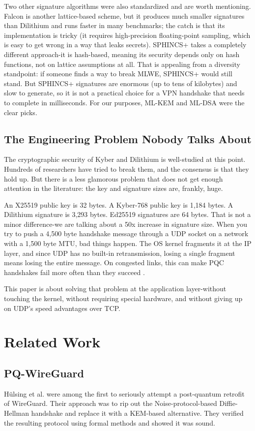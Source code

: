 \documentclass[10pt, conference, letterpaper]{IEEEtran}
\begin{document}
Two other signature algorithms were also standardized and are worth mentioning. Falcon is another lattice-based scheme, but it produces much smaller signatures than Dilithium and runs faster in many benchmarks; the catch is that its implementation is tricky (it requires high-precision floating-point sampling, which is easy to get wrong in a way that leaks secrets). SPHINCS+ takes a completely different approach-it is hash-based, meaning its security depends only on hash functions, not on lattice assumptions at all. That is appealing from a diversity standpoint: if someone finds a way to break MLWE, SPHINCS+ would still stand. But SPHINCS+ signatures are enormous (up to tens of kilobytes) and slow to generate, so it is not a practical choice for a VPN handshake that needs to complete in milliseconds. For our purposes, ML-KEM and ML-DSA were the clear picks.

\subsection{The Engineering Problem Nobody Talks About}
The cryptographic security of Kyber and Dilithium is well-studied at this point. Hundreds of researchers have tried to break them, and the consensus is that they hold up. But there is a less glamorous problem that does not get enough attention in the literature: the key and signature sizes are, frankly, huge.

An X25519 public key is 32 bytes. A Kyber-768 public key is 1,184 bytes. A Dilithium signature is 3,293 bytes. Ed25519 signatures are 64 bytes. That is not a minor difference-we are talking about a 50x increase in signature size. When you try to push a 4,500 byte handshake message through a UDP socket on a network with a 1,500 byte MTU, bad things happen. The OS kernel fragments it at the IP layer, and since UDP has no built-in retransmission, losing a single fragment means losing the entire message. On congested links, this can make PQC handshakes fail more often than they succeed \cite{shim2025qtrustnet}.

This paper is about solving that problem at the application layer-without touching the kernel, without requiring special hardware, and without giving up on UDP's speed advantages over TCP.

\section{Related Work}

\subsection{PQ-WireGuard}
H\"ulsing et al. \cite{hulsing2017pqwireguard} were among the first to seriously attempt a post-quantum retrofit of WireGuard. Their approach was to rip out the Noise-protocol-based Diffie-Hellman handshake and replace it with a KEM-based alternative. They verified the resulting protocol using formal methods and showed it was sound.
\end{document}
